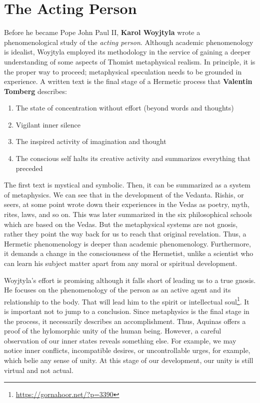 \section{The Acting Person}

Before he became Pope John Paul II, \textbf{Karol Woyjtyla} wrote a phenomenological study of the \emph{acting person}. Although academic phenomenology is idealist, Woyjtyla employed its methodology in the service of gaining a deeper understanding of some aspects of Thomist metaphysical realism. In principle, it is the proper way to proceed; metaphysical speculation needs to be grounded in experience. A written text is the final stage of a Hermetic process that \textbf{Valentin Tomberg} describes:

\begin{enumerate}
\item The state of concentration without effort (beyond words and thoughts) 
\item Vigilant inner silence 
\item The inspired activity of imagination and thought 
\item The conscious self halts its creative activity and summarizes everything that preceded 
\end{enumerate}
The first text is mystical and symbolic. Then, it can be summarized as a system of metaphysics. We can see that in the development of the Vedanta. Rishis, or seers, at some point wrote down their experiences in the Vedas as poetry, myth, rites, laws, and so on. This was later summarized in the six philosophical schools which are based on the Vedas. But the metaphysical systems are not gnosis, rather they point the way back for us to reach that original revelation. Thus, a Hermetic phenomenology is deeper than academic phenomenology. Furthermore, it demands a change in the consciousness of the Hermetist, unlike a scientist who can learn his subject matter apart from any moral or spiritual development.

Woyjtyla's effort is promising although it falls short of leading us to a true gnosis. He focuses on the phenomenology of the person as an active agent and its relationship to the body. That will lead him to the spirit or intellectual soul\footnote{\url{https://gornahoor.net/?p=3390}}. It is important not to jump to a conclusion. Since metaphysics is the final stage in the process, it necessarily describes an accomplishment. Thus, Aquinas offers a proof of the hylomorphic unity of the human being. However, a careful observation of our inner states reveals something else. For example, we may notice inner conflicts, incompatible desires, or uncontrollable urges, for example, which belie any sense of unity. At this stage of our development, our unity is still virtual and not actual.

